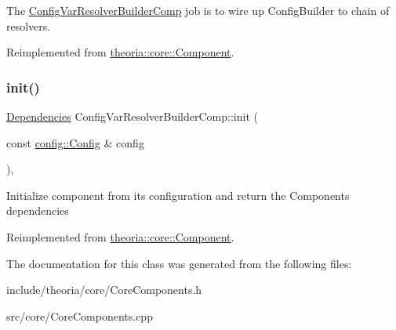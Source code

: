 The \hyperlink{classtheoria_1_1core_1_1ConfigVarResolverBuilderComp}{Config\+Var\+Resolver\+Builder\+Comp} job is to wire up Config\+Builder to chain of resolvers. 

Reimplemented from \hyperlink{classtheoria_1_1core_1_1Component_afd8acc89e2cd36e92bebe7e6fa530764}{theoria\+::core\+::\+Component}.

\mbox{\label{classtheoria_1_1core_1_1ConfigVarResolverBuilderComp_aadf94c8b3d765667eaf9d7c91ac65342}} 
\subsubsection{\texorpdfstring{init()}{init()}}
{\footnotesize\ttfamily \hyperlink{classtheoria_1_1core_1_1Dependencies}{Dependencies} Config\+Var\+Resolver\+Builder\+Comp\+::init (\begin{DoxyParamCaption}\item[{const \hyperlink{classtheoria_1_1config_1_1Config}{config\+::\+Config} \&}]{config }\end{DoxyParamCaption})\hspace{0.3cm}{\ttfamily [override]}, {\ttfamily [virtual]}}

Initialize component from its configuration and return the Components dependencies 

Reimplemented from \hyperlink{classtheoria_1_1core_1_1Component_a7ed45f6e38442a40666ae4556f794f7d}{theoria\+::core\+::\+Component}.



The documentation for this class was generated from the following files\+:\begin{DoxyCompactItemize}
\item 
include/theoria/core/Core\+Components.\+h\item 
src/core/Core\+Components.\+cpp\end{DoxyCompactItemize}
